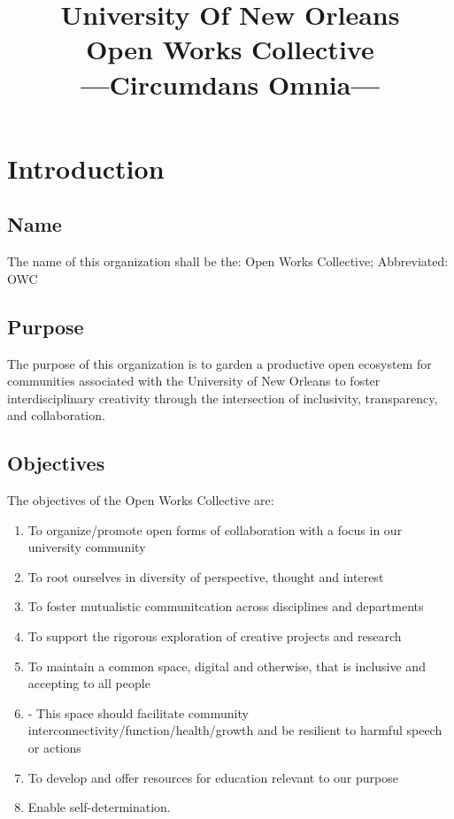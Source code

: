 \documentclass{article}
\title{University Of New Orleans \\ Open Works Collective \\---Circumdans Omnia---}
\newcommand{\article}[1]{\section{#1} \label{#1}}
\newcommand{\asection}[1]{\subsection{#1} \label{#1}}
\begin{document}
\maketitle
\tableofcontents

\newpage
\article{Introduction}

\asection{Name}
The name of this organization shall be the: 
Open Works Collective;
Abbreviated: OWC

\asection{Purpose}
The purpose of this organization is to garden a productive open ecosystem for communities associated with the University of New Orleans to foster interdisciplinary creativity through the intersection of inclusivity, transparency, and collaboration.

\asection{Objectives}
The objectives of the Open Works Collective are:
\begin{enumerate}
	\item To organize/promote open forms of collaboration with a focus in our university community
	\item To root ourselves in diversity of perspective, thought and interest
	\item To foster mutualistic communitcation across disciplines and departments 
	\item To support the rigorous exploration of creative projects and research
	\item To maintain a common space, digital and otherwise, that is inclusive and accepting to all people
	\item - This space should facilitate community interconnectivity/function/health/growth and be resilient to harmful speech or actions
	\item To develop and offer resources for education relevant to our purpose 
	\item Enable self-determination.
\end{enumerate}

\end{document}
